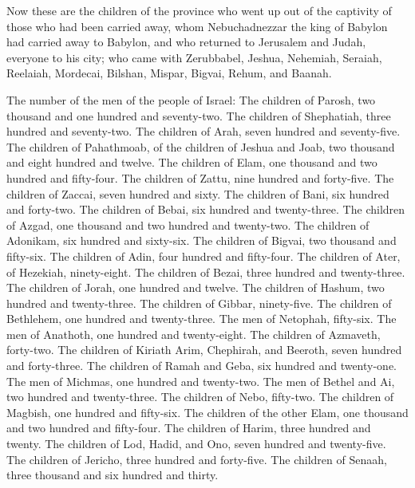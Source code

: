  Now these are the children of the province who went up out
of the captivity of those who had been carried away, whom Nebuchadnezzar
the king of Babylon had carried away to Babylon, and who returned to
Jerusalem and Judah, everyone to his city;  who came with
Zerubbabel, Jeshua, Nehemiah, Seraiah, Reelaiah, Mordecai, Bilshan,
Mispar, Bigvai, Rehum, and Baanah.

The number of the men of the people of Israel:  The children
of Parosh, two thousand and one hundred and seventy-two. 
The children of Shephatiah, three hundred and seventy-two. 
The children of Arah, seven hundred and seventy-five.  The
children of Pahathmoab, of the children of Jeshua and Joab, two thousand
and eight hundred and twelve.  The children of Elam, one
thousand and two hundred and fifty-four.  The children of
Zattu, nine hundred and forty-five.  The children of Zaccai,
seven hundred and sixty.  The children of Bani, six hundred
and forty-two.  The children of Bebai, six hundred and
twenty-three.  The children of Azgad, one thousand and two
hundred and twenty-two.  The children of Adonikam, six
hundred and sixty-six.  The children of Bigvai, two
thousand and fifty-six.  The children of Adin, four hundred
and fifty-four.  The children of Ater, of Hezekiah,
ninety-eight.  The children of Bezai, three hundred and
twenty-three.  The children of Jorah, one hundred and
twelve.  The children of Hashum, two hundred and
twenty-three.  The children of Gibbar, ninety-five.
 The children of Bethlehem, one hundred and twenty-three.
 The men of Netophah, fifty-six.  The men of
Anathoth, one hundred and twenty-eight.  The children of
Azmaveth, forty-two.  The children of Kiriath Arim,
Chephirah, and Beeroth, seven hundred and forty-three.  The
children of Ramah and Geba, six hundred and twenty-one. 
The men of Michmas, one hundred and twenty-two.  The men of
Bethel and Ai, two hundred and twenty-three.  The children
of Nebo, fifty-two.  The children of Magbish, one hundred
and fifty-six.  The children of the other Elam, one
thousand and two hundred and fifty-four.  The children of
Harim, three hundred and twenty.  The children of Lod,
Hadid, and Ono, seven hundred and twenty-five.  The
children of Jericho, three hundred and forty-five.  The
children of Senaah, three thousand and six hundred and thirty.

